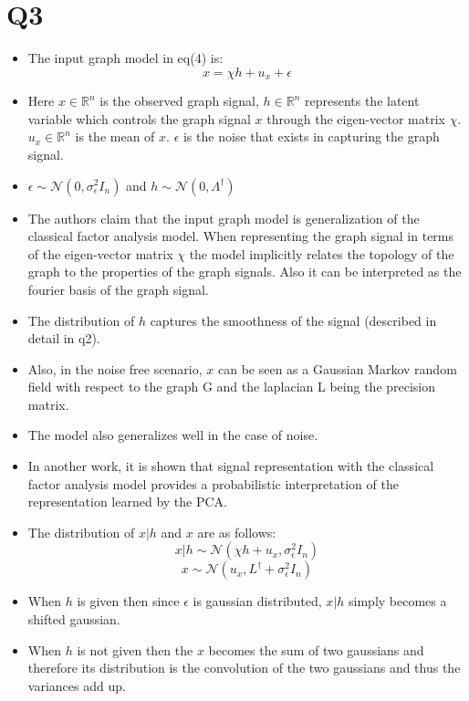 \documentclass{article}
\begin{document}
\section*{Q3}
\begin{itemize}
\item The input graph model in eq(4) is:
  $$ x = \chi h + u_x + \epsilon$$
\item Here $x \in \mathbb{R}^n$ is the observed graph signal, $h \in \mathbb{R}^n$ represents the latent variable which controls the graph signal $x$ through the eigen-vector matrix $\chi$. $u_x \in \mathbb{R}^n$ is the mean of $x$. $\epsilon$ is the noise that exists in capturing the graph signal.
\item $\epsilon \sim \mathcal{N}(0, \sigma_{\epsilon}^2I_{n})$ and $h \sim \mathcal{N}(0, \Lambda^{\dagger})$
\item The authors claim that the input graph model is generalization of the classical factor analysis model. When representing the graph signal in terms of the eigen-vector matrix $\chi$ the model implicitly relates the topology of the graph to the properties of the graph signals. Also it can be interpreted as the fourier basis of the graph signal.
\item The distribution of $h$ captures the smoothness of the signal (described in detail in q2).
\item Also, in the noise free scenario, $x$ can be seen as a Gaussian Markov random field with respect to the graph G and the laplacian L being the precision matrix.
\item The model also generalizes well in the case of noise.
\item In another work, it is shown that signal representation with the classical factor analysis model provides a probabilistic interpretation of the representation learned by the PCA.
\item The distribution of $x|h$ and $x$ are as follows:
  $$x|h \sim \mathcal{N}(\chi h + u_x, \sigma_{\epsilon}^2 I_n)$$
  $$x \sim \mathcal{N}(u_x, L^{\dagger} + \sigma_{\epsilon}^2 I_n)$$
\item When $h$ is given then since $\epsilon$ is gaussian distributed, $x|h$ simply becomes a shifted gaussian.
\item When $h$ is not given then the $x$ becomes the sum of two gaussians and therefore its distribution is the convolution of the two gaussians and thus the variances add up.
\end{itemize}
\end{document}
